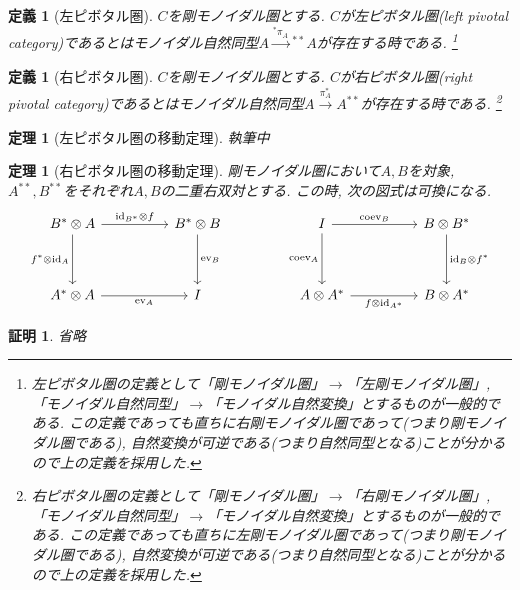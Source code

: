 \documentclass[a4paper,12pt]{ltjsarticle}
\theoremstyle{break}
\newtheorem{defn}[thm]{定義}
\newtheorem{thrm}[thm]{定理}
\newtheorem*{prf}{証明}
\newcommand{\xr}[1]{\xrightarrow{#1}}
\newcommand{\id}{\mathrm{id}}
\newcommand{\eva}{\mathrm{ev}}
\newcommand{\coev}{\mathrm{coev}}
\newcommand{\ot}{\otimes}
\numberwithin{equation}{section}
\begin{document}
\begin{defn}[左ピボタル圏]
  $C$を剛モノイダル圏とする. 
  $C$が左ピボタル圏(left pivotal category)であるとはモノイダル自然同型$A \xr{{}^*\pi_A} {}^{**}A$が存在する時である.
  \footnote{
      左ピボタル圏の定義として「剛モノイダル圏」$\to$「左剛モノイダル圏」, 「モノイダル自然同型」$\to$「モノイダル自然変換」とするものが一般的である. 
      この定義であっても直ちに右剛モノイダル圏であって(つまり剛モノイダル圏である), 自然変換が可逆である(つまり自然同型となる)ことが分かるので上の定義を採用した. 
    }
\end{defn}

\begin{defn}[右ピボタル圏]
  $C$を剛モノイダル圏とする. 
  $C$が右ピボタル圏(right pivotal category)であるとはモノイダル自然同型$A \xr{\pi^*_A} A^{**}$が存在する時である.
  \footnote{
      右ピボタル圏の定義として「剛モノイダル圏」$\to$「右剛モノイダル圏」, 「モノイダル自然同型」$\to$「モノイダル自然変換」とするものが一般的である. 
      この定義であっても直ちに左剛モノイダル圏であって(つまり剛モノイダル圏である), 自然変換が可逆である(つまり自然同型となる)ことが分かるので上の定義を採用した. 
    }
\end{defn}

\begin{thrm}[左ピボタル圏の移動定理]
  執筆中
\end{thrm}

\begin{thrm}[右ピボタル圏の移動定理]
  剛モノイダル圏において$A,B$を対象, $A^{**},B^{**}$をそれぞれ$A,B$の二重右双対とする. 
  この時, 次の図式は可換になる. 
  \[\begin{tikzcd}
    {B^* \ot A} && {B^* \ot B} && I && {B \ot B^*} \\
    \\
    {A^* \ot A} && I && {A \ot A^*} && {B \ot A^*}
    \arrow["{\id_{B^*} \ot f}", from=1-1, to=1-3]
    \arrow["{f^* \ot \id_A}"', from=1-1, to=3-1]
    \arrow["{\eva_A}"', from=3-1, to=3-3]
    \arrow["{\eva_B}", from=1-3, to=3-3]
    \arrow["{\coev_B}", from=1-5, to=1-7]
    \arrow["{\coev_A}"', from=1-5, to=3-5]
    \arrow["{f \ot \id_{A^*}}"', from=3-5, to=3-7]
    \arrow["{\id_B \ot f^*}", from=1-7, to=3-7]
  \end{tikzcd}\]
\end{thrm}

\begin{prf}
  省略
\end{prf}
\end{document}
